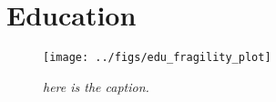 \chapter{Education}

\thispagestyle{empty}

\newpage


    
    





\begin{figure}[htbp]
  \centering
  \texttt{[image: ../figs/edu\_fragility\_plot]} \hfill
  \caption{\it here is the caption.}
  \label{fig:edu_frag_plot}
\end{figure}

\lipsum[1-10]

\newpage
